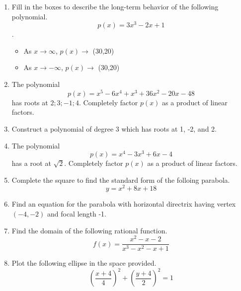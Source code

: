 \documentclass{article}
\begin{document}
\TestTitle[class={College Algebra}, name={Test 3}, term={Spring}, date={Oct. 19}, year={2015}, form={A}]

\AlgebraFacts[geom={show}]

\begin{enumerate}
\item Fill in the boxes to describe the long-term behavior of the following polynomial. \[ p(x) = 3x^3 - 2x + 1 \].

\begin{itemize}
\item As $x \rightarrow \infty$, $p(x) \rightarrow$ \framebox(30,20){} \vspace{0.5cm}
\item As $x \rightarrow -\infty$, $p(x) \rightarrow$ \framebox(30,20){}
\end{itemize} \vspace{1cm}

\item The polynomial \[ p(x) = x^5 - 6x^4 + x^3 + 36x^2 - 20x - 48 \] has roots at ${2;3;-1;4}$. Completely factor $p(x)$ as a product of linear factors. \vspace{6cm}

\item Construct a polynomial of degree 3 which has roots at 1, -2, and 2. \vspace{5cm}

\newpage

\item The polynomial \[ p(x) = x^4 - 3x^3 + 6x - 4 \] has a root at $\sqrt{2}$. Completely factor $p(x)$ as a product of linear factors. \vspace{9cm}

\item Complete the square to find the standard form of the folloing parabola. \[ y = x^2 + 8x + 18 \] \vspace{6cm}

\item Find an equation for the parabola with horizontal directrix having vertex $(-4, -2)$ and focal length -1. \vspace{2cm}

\newpage

\item Find the domain of the following rational function. \[ f(x) = \frac{x^2 - x - 2}{x^3 - x^2 - x + 1} \] \vspace{5cm}

\item Plot the following ellipse in the space provided. \[ \left(\frac{x + 4}{4}\right)^2 + \left(\frac{y + 4}{2}\right)^2 = 1 \]


\end{enumerate}
\end{document}
